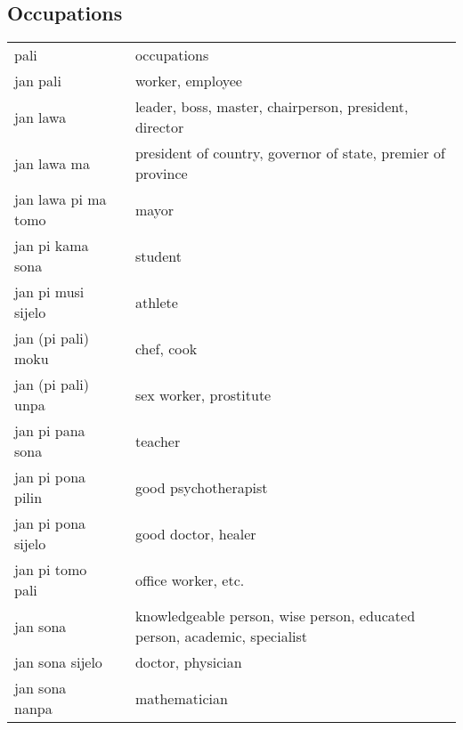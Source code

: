 \subsection{Occupations}
%
\begin{supertabular}{p{4,5cm}|ll}
    pali                  &  & occupations                                                              \\
    jan pali              &  & worker, employee                                                         \\
    jan lawa              &  & leader, boss, master, chairperson, president, director                   \\
    jan lawa ma           &  & president of country, governor of state, premier of province             \\
    jan lawa pi ma tomo   &  & mayor                                                                    \\
    jan pi kama sona      &  & student                                                                  \\
    jan pi musi sijelo    &  & athlete                                                                  \\
    jan (pi pali) moku    &  & chef, cook                                                               \\
    jan (pi pali) unpa    &  & sex worker, prostitute                                                   \\
    jan pi pana sona      &  & teacher                                                                  \\
    jan pi pona pilin     &  & good psychotherapist                                                     \\
    jan pi pona sijelo    &  & good doctor, healer                                                      \\
    jan pi tomo pali      &  & office worker, etc.                                                      \\
    jan sona              &  & knowledgeable person, wise person, educated person, academic, specialist \\
    jan sona sijelo       &  & doctor, physician                                                        \\
    jan sona nanpa        &  & mathematician                                                            \\

\end{supertabular}
